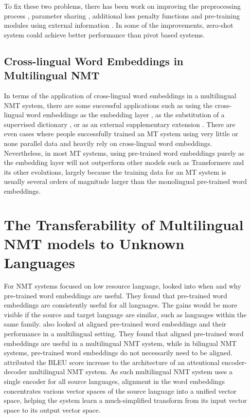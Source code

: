 \documentclass[thesis,fonts=libertine]{cluu}
\begin{document}
To fix these two problems, there has been work on improving the preprocessing process \parencite{Lakew:2018aa}, parameter sharing \parencite{Firat:2016aa, Blackwood:2018aa}, additional loss penalty functions \parencite{Arivazhagan:2019aa} and pre-training modules using external information \parencite{Baziotis:2020aa}. In some of the improvements, zero-shot system could achieve better performance than pivot based systems.

\section{Cross-lingual Word Embeddings in Multilingual NMT}

In terms of the application of cross-lingual word embeddings in a multilingual NMT system, there are some successful applications such as using the cross-lingual word embeddings as the embedding layer \parencite{neishi-etal-2017-bag, Artetxe:2017aa}, as the substitution of a supervised dictionary \parencite{Conneau:2017aa}, or as an external supplementary extension \parencite{inproceedings}. There are even cases where people successfully trained an MT system using very little or none parallel data \parencite{Conneau:2017aa} and heavily rely on cross-lingual word embeddings. Nevertheless, in most MT systems, using pre-trained word embeddings purely as the embedding layer will not outperform other models such as Transformers \parencite{Vaswani:2017aa} and its other evolutions, largely because the training data for an MT system is usually several orders of magnitude larger than the monolingual pre-trained word embeddings.

\chapter{The Transferability of Multilingual NMT models to Unknown Languages}
\label{chap:research_question}

For NMT systems focused on low resource language, \textcite{Qi:2018aa} looked into when and why pre-trained word embeddings are useful. They found that pre-trained word embeddings are consistently useful for all languages. The gains would be more visible if the source and target language are similar, such as languages within the same family. \textcite{Qi:2018aa} also looked at aligned pre-trained word embeddings and their performance in a multilingual setting. They found that aligned pre-trained word embeddings are useful in a multilingual NMT system, while in bilingual NMT systems, pre-trained word embeddings do not necessarily need to be aligned. \textcite{Qi:2018aa} attributed the BLEU score increase to the architecture of an attentional encoder-decoder multilingual NMT system. As such multilingual NMT system uses a single encoder for all source languages, alignment in the word embeddings concentrates various vector spaces of the source language into a unified vector space, helping the system learn a much-simplified transform from its input vector space to its output vector space.
\end{document}
